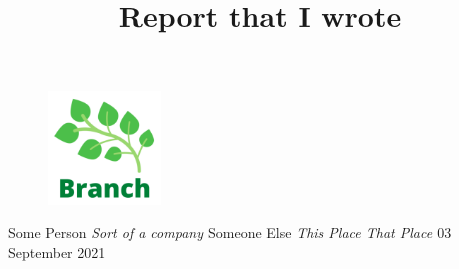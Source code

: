 \documentclass[
  11pt,
  american,
  letterpaper,
  ]{article}
\title{Report that I wrote}
\newenvironment{changemargin}[2]{%
\begin{list}{}{%
\setlength{\leftmargin}{#1}%
\setlength{\rightmargin}{#2}%
}%
\item[]}{\end{list}}
\begin{document}


\begin{titlingpage}


  	\vspace{1cm}
      \begin{figure}[H]
        \begin{center}
    			    			  \includegraphics[width=
    			        			      3cm
    		      ]{Branch-logo.png}
              		\end{center}
  		\end{figure}

  	\vspace{2.5cm}
  	
    \begin{changemargin}{1cm}{1cm}
      \begin{center}
        \uppercase{\Huge{}\linebreak}
        \uppercase{\huge{}}
      \end{center}
    \end{changemargin}

    \vspace{4cm}

     \par 
     \par 

    \vspace*{\fill}

    \begin{center}
      \begin{authorfont}
        {Some Person
          \small{\textit{ }}}
            \linebreak
        {
          \small{\textit{%
            {Sort of a company \linebreak}  }}}
            \linebreak
        {Someone Else
          \small{\textit{ }}}
            \linebreak
        {
          \small{\textit{%
            {This Place \linebreak} %
            {That Place \linebreak}  }}}
            \linebreak
         03 September 2021 %
      \end{authorfont}
      \vspace{2cm}
      

\end{center}
\end{titlingpage}
\end{document}
